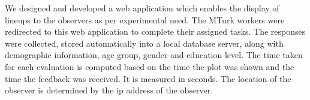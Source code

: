 \documentclass[10pt]{article}\usepackage[]{graphicx}\usepackage[]{color}
\begin{document}

We designed and developed a web application which enables the display of lineups to the observers as per experimental need. The MTurk workers were redirected to this web application to complete their assigned tasks. The responses were collected, stored automatically into a local database server, along with demographic information, age group, gender and education level. The time taken for each evaluation is computed based on the time the plot was shown and the time the feedback was received. It is measured in seconds. The location of the observer is determined by the ip address of the observer.
\end{document}

